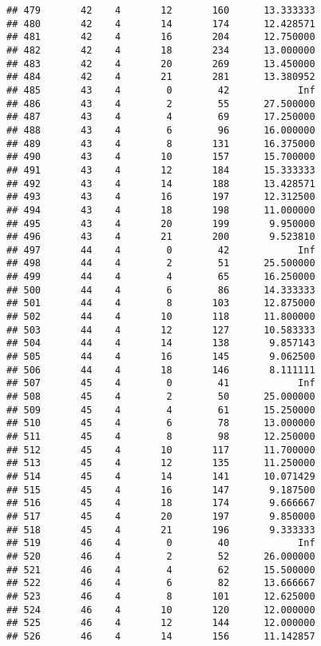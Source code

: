 \documentclass[
]{article}
\begin{document}
\begin{verbatim}
## 479       42    4       12       160      13.333333
## 480       42    4       14       174      12.428571
## 481       42    4       16       204      12.750000
## 482       42    4       18       234      13.000000
## 483       42    4       20       269      13.450000
## 484       42    4       21       281      13.380952
## 485       43    4        0        42            Inf
## 486       43    4        2        55      27.500000
## 487       43    4        4        69      17.250000
## 488       43    4        6        96      16.000000
## 489       43    4        8       131      16.375000
## 490       43    4       10       157      15.700000
## 491       43    4       12       184      15.333333
## 492       43    4       14       188      13.428571
## 493       43    4       16       197      12.312500
## 494       43    4       18       198      11.000000
## 495       43    4       20       199       9.950000
## 496       43    4       21       200       9.523810
## 497       44    4        0        42            Inf
## 498       44    4        2        51      25.500000
## 499       44    4        4        65      16.250000
## 500       44    4        6        86      14.333333
## 501       44    4        8       103      12.875000
## 502       44    4       10       118      11.800000
## 503       44    4       12       127      10.583333
## 504       44    4       14       138       9.857143
## 505       44    4       16       145       9.062500
## 506       44    4       18       146       8.111111
## 507       45    4        0        41            Inf
## 508       45    4        2        50      25.000000
## 509       45    4        4        61      15.250000
## 510       45    4        6        78      13.000000
## 511       45    4        8        98      12.250000
## 512       45    4       10       117      11.700000
## 513       45    4       12       135      11.250000
## 514       45    4       14       141      10.071429
## 515       45    4       16       147       9.187500
## 516       45    4       18       174       9.666667
## 517       45    4       20       197       9.850000
## 518       45    4       21       196       9.333333
## 519       46    4        0        40            Inf
## 520       46    4        2        52      26.000000
## 521       46    4        4        62      15.500000
## 522       46    4        6        82      13.666667
## 523       46    4        8       101      12.625000
## 524       46    4       10       120      12.000000
## 525       46    4       12       144      12.000000
## 526       46    4       14       156      11.142857

\end{verbatim}
\end{document}
